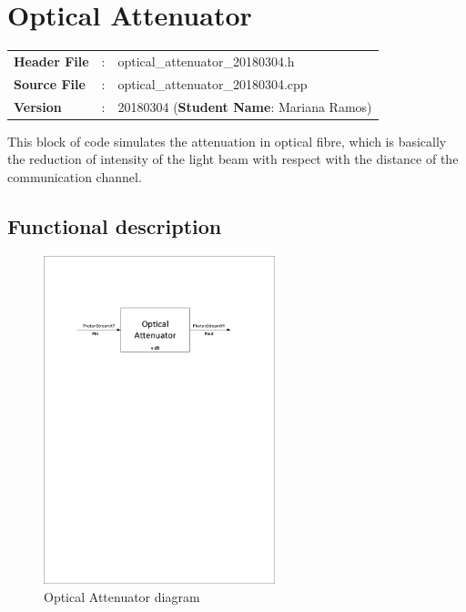\clearpage

\section{Optical Attenuator}

\begin{tcolorbox}	
\begin{tabular}{p{2.75cm} p{0.2cm} p{10.5cm}} 	
\textbf{Header File}   &:& optical\_attenuator\_20180304.h \\
\textbf{Source File}   &:& optical\_attenuator\_20180304.cpp \\
\textbf{Version}       &:& 20180304 (\textbf{Student Name}: Mariana Ramos)
\end{tabular}
\end{tcolorbox}


This block of code simulates the attenuation in optical fibre, which is basically the reduction of intensity of the light beam with respect with the distance of the communication channel. 





\subsection*{Functional description}

\begin{figure}[h!]
	\centering
	\includegraphics[clip, trim=3cm 20cm 4cm 4cm, width=0.60\textwidth]{../lib/optical_attenuator/figures/diagram.pdf}
	\caption{Optical Attenuator diagram}\label{fig:diagram}
\end{figure}

